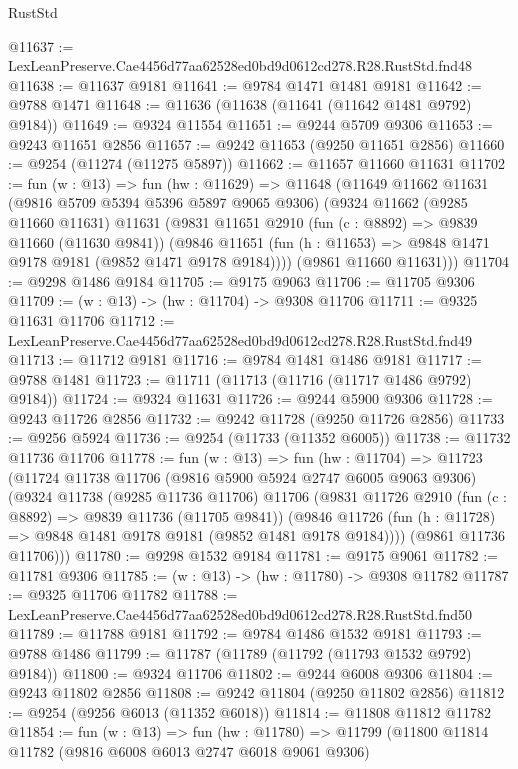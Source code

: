 \begin{lexlean}{RustStd}
\begin{coremodule}
@11637 := LexLeanPreserve.Cae4456d77aa62528ed0bd9d0612cd278.R28.RustStd.fnd48
@11638 := @11637 @9181
@11641 := @9784 @1471 @1481 @9181
@11642 := @9788 @1471
@11648 := @11636 (@11638 (@11641 (@11642 @1481 @9792) @9184))
@11649 := @9324 @11554
@11651 := @9244 @5709 @9306
@11653 := @9243 @11651 @2856
@11657 := @9242 @11653 (@9250 @11651 @2856)
@11660 := @9254 (@11274 (@11275 @5897))
@11662 := @11657 @11660 @11631
@11702 := fun (w : @13) =>
  fun (hw : @11629) =>
  @11648
    (@11649
      @11662
      @11631
      (@9816 @5709 @5394 @5396 @5897 @9065 @9306)
      (@9324
        @11662
        (@9285 @11660 @11631)
        @11631
        (@9831
          @11651
          @2910
          (fun (c : @8892) => @9839 @11660 (@11630 @9841))
          (@9846 @11651 (fun (h : @11653) => @9848 @1471 @9178 @9181 (@9852 @1471 @9178 @9184))))
        (@9861 @11660 @11631)))
@11704 := @9298 @1486 @9184
@11705 := @9175 @9063
@11706 := @11705 @9306
@11709 := (w : @13) -> (hw : @11704) -> @9308 @11706
@11711 := @9325 @11631 @11706
@11712 := LexLeanPreserve.Cae4456d77aa62528ed0bd9d0612cd278.R28.RustStd.fnd49
@11713 := @11712 @9181
@11716 := @9784 @1481 @1486 @9181
@11717 := @9788 @1481
@11723 := @11711 (@11713 (@11716 (@11717 @1486 @9792) @9184))
@11724 := @9324 @11631
@11726 := @9244 @5900 @9306
@11728 := @9243 @11726 @2856
@11732 := @9242 @11728 (@9250 @11726 @2856)
@11733 := @9256 @5924
@11736 := @9254 (@11733 (@11352 @6005))
@11738 := @11732 @11736 @11706
@11778 := fun (w : @13) =>
  fun (hw : @11704) =>
  @11723
    (@11724
      @11738
      @11706
      (@9816 @5900 @5924 @2747 @6005 @9063 @9306)
      (@9324
        @11738
        (@9285 @11736 @11706)
        @11706
        (@9831
          @11726
          @2910
          (fun (c : @8892) => @9839 @11736 (@11705 @9841))
          (@9846 @11726 (fun (h : @11728) => @9848 @1481 @9178 @9181 (@9852 @1481 @9178 @9184))))
        (@9861 @11736 @11706)))
@11780 := @9298 @1532 @9184
@11781 := @9175 @9061
@11782 := @11781 @9306
@11785 := (w : @13) -> (hw : @11780) -> @9308 @11782
@11787 := @9325 @11706 @11782
@11788 := LexLeanPreserve.Cae4456d77aa62528ed0bd9d0612cd278.R28.RustStd.fnd50
@11789 := @11788 @9181
@11792 := @9784 @1486 @1532 @9181
@11793 := @9788 @1486
@11799 := @11787 (@11789 (@11792 (@11793 @1532 @9792) @9184))
@11800 := @9324 @11706
@11802 := @9244 @6008 @9306
@11804 := @9243 @11802 @2856
@11808 := @9242 @11804 (@9250 @11802 @2856)
@11812 := @9254 (@9256 @6013 (@11352 @6018))
@11814 := @11808 @11812 @11782
@11854 := fun (w : @13) =>
  fun (hw : @11780) =>
  @11799
    (@11800
      @11814
      @11782
      (@9816 @6008 @6013 @2747 @6018 @9061 @9306)

\end{coremodule}
\end{lexlean}
